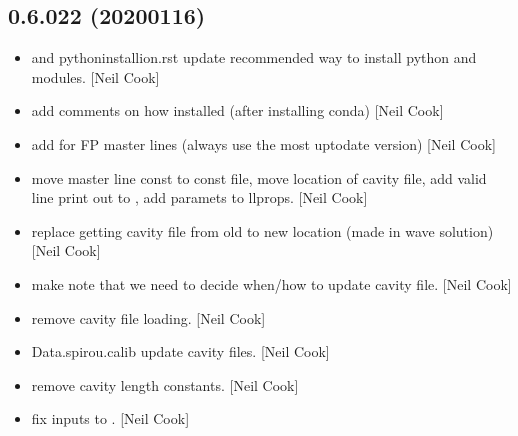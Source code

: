 \documentclass[a4paper,10pt,english]{report}
\begin{document}
\subsection{0.6.022 (2020\sphinxhyphen{}01\sphinxhyphen{}16)}
\label{\detokenize{misc/changelog:id15}}\begin{itemize}
\item {} 
 and pythoninstallion.rst \sphinxhyphen{} update recommended way to
install python and modules. {[}Neil Cook{]}

\item {} 
 \sphinxhyphen{} add comments on how installed (after installing
conda) {[}Neil Cook{]}

\item {} 
 \sphinxhyphen{} add  for FP
master lines (always use the most up\sphinxhyphen{}to\sphinxhyphen{}date version) {[}Neil Cook{]}

\item {} 
 \sphinxhyphen{} move master line const to const file, move
location of cavity file, add valid line print out to ,
add  paramets to llprops. {[}Neil Cook{]}

\item {} 
 \sphinxhyphen{} replace getting cavity file from old to new
location (made in wave solution) {[}Neil Cook{]}

\item {} 
 \sphinxhyphen{} make note that we need to
decide when/how to update cavity file. {[}Neil Cook{]}

\item {} 
 \sphinxhyphen{} remove cavity file loading. {[}Neil Cook{]}

\item {} 
Data.spirou.calib \sphinxhyphen{} update cavity files. {[}Neil Cook{]}

\item {} 
 \sphinxhyphen{} remove cavity length
constants. {[}Neil Cook{]}

\item {} 
 \sphinxhyphen{} fix inputs to . {[}Neil
Cook{]}


\end{itemize}
\end{document}
